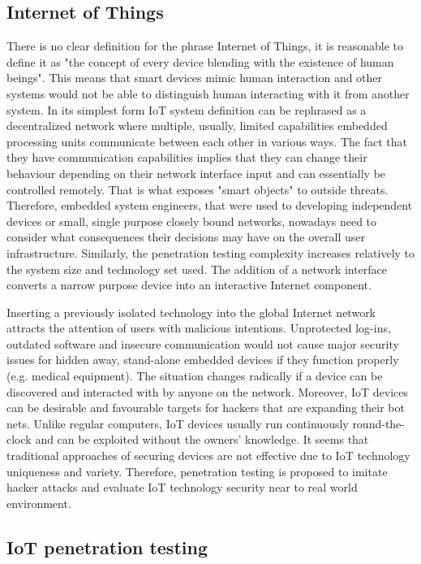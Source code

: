 \subsection{Internet of Things}
There is no clear definition for the phrase Internet of Things, it is reasonable to define it as "the concept of every device blending with the existence of human beings"\cite{DBLP:journals/corr/MendezPY17}. This means that smart devices mimic human interaction and other systems would not be able to distinguish human interacting with it from another system. In its simplest form IoT system definition can be rephrased as a decentralized network where multiple, usually, limited capabilities embedded processing units communicate between each other in various ways\cite{itu-t2060}. The fact that they have communication capabilities implies that they can change their behaviour depending on their network interface input and can essentially be controlled remotely. That is what exposes "smart objects" to outside threats\cite{riahi:hal-00868362}. Therefore, embedded system engineers, that were used to developing independent devices or small, single purpose closely bound networks, nowadays need to consider what consequences their decisions may have on the overall user infrastructure. Similarly, the penetration testing complexity increases relatively to the system size and technology set used. The addition of a network interface converts a narrow purpose device into an interactive Internet component.

Inserting a previously isolated technology into the global Internet network attracts the attention of users with malicious intentions. Unprotected log-ins, outdated software and insecure communication would not cause major security issues for hidden away, stand-alone embedded devices if they function properly (e.g. medical equipment).  The situation changes radically if a device can be discovered and interacted with by anyone on the network. Moreover, IoT devices can be desirable and favourable targets for hackers that are expanding their bot nets. Unlike regular computers, IoT devices usually run continuously round-the-clock and can be exploited without the owners’ knowledge\cite{191952}. It seems that traditional approaches of securing devices are not effective\cite{DBLP:journals/corr/abs-1803-05022} due to IoT technology uniqueness and variety. Therefore, penetration testing is proposed to imitate hacker attacks and evaluate IoT technology security near to real world environment.

\subsection{IoT penetration testing}

